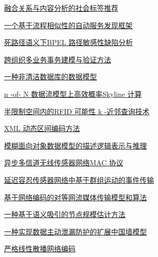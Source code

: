 \documentclass[a4paper]{article}
\begin{document}
\href{http://www.jos.org.cn/ch/reader/download_pdf.aspx?file_no=4001&year_id=2012&quarter_id=3&falg=1}{融合关系与内容分析的社会标签推荐}

\href{http://www.jos.org.cn/ch/reader/download_pdf.aspx?file_no=4010&year_id=2012&quarter_id=3&falg=1}{一个基于流程相似性的自动服务发现框架}

\href{http://www.jos.org.cn/ch/reader/download_pdf.aspx?file_no=4065&year_id=2012&quarter_id=3&falg=1}{死路径语义下BPEL 路径敏感性缺陷分析}

\href{http://www.jos.org.cn/ch/reader/download_pdf.aspx?file_no=4103&year_id=2012&quarter_id=3&falg=1}{跨组织多业务事务建模与验证方法}

\href{http://www.jos.org.cn/ch/reader/download_pdf.aspx?file_no=4042&year_id=2012&quarter_id=3&falg=1}{一种非清洁数据库的数据模型}

\href{http://www.jos.org.cn/ch/reader/download_pdf.aspx?file_no=4050&year_id=2012&quarter_id=3&falg=1}{n -of- N 数据流模型上高效概率Skyline 计算}

\href{http://www.jos.org.cn/ch/reader/download_pdf.aspx?file_no=4060&year_id=2012&quarter_id=3&falg=1}{半限制空间内的RFID 可能性 k -近邻查询技术}

\href{http://www.jos.org.cn/ch/reader/download_pdf.aspx?file_no=4003&year_id=2012&quarter_id=3&falg=1}{XML 动态区间编码方法}

\href{http://www.jos.org.cn/ch/reader/download_pdf.aspx?file_no=4037&year_id=2012&quarter_id=3&falg=1}{模糊面向对象数据模型的描述逻辑表示与推理}

\href{http://www.jos.org.cn/ch/reader/download_pdf.aspx?file_no=3984&year_id=2012&quarter_id=3&falg=1}{异步多信道无线传感器网络MAC 协议}

\href{http://www.jos.org.cn/ch/reader/download_pdf.aspx?file_no=3971&year_id=2012&quarter_id=3&falg=1}{延迟容忍传感器网络中基于群组运动的事件传输}

\href{http://www.jos.org.cn/ch/reader/download_pdf.aspx?file_no=3991&year_id=2012&quarter_id=3&falg=1}{基于网络编码的对等网流媒体传输模型和算法}

\href{http://www.jos.org.cn/ch/reader/download_pdf.aspx?file_no=3990&year_id=2012&quarter_id=3&falg=1}{一种基于语义吸引的节点规模估计方法}

\href{http://www.jos.org.cn/ch/reader/download_pdf.aspx?file_no=3974&year_id=2012&quarter_id=3&falg=1}{一种实现数据主动泄漏防护的扩展中国墙模型}

\href{http://www.jos.org.cn/ch/reader/download_pdf.aspx?file_no=3963&year_id=2012&quarter_id=3&falg=1}{严格线性散播网络编码}
\end{document}
